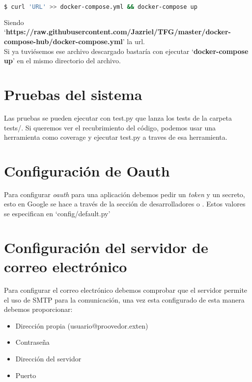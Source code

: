 \lstset{style=linestyle}
\begin{lstlisting}[language=bash]
$ curl 'URL' >> docker-compose.yml && docker-compose up
\end{lstlisting}

Siendo `\textbf{https://raw.githubusercontent.com/Jazriel/TFG/master/docker-compose-hub/docker-compose.yml}' la url.
\hphantom{sin esto quedaba mal}\\

Si ya tuviésemos ese archivo descargado bastaría con ejecutar `\textbf{docker-compose up}' en el mismo directorio del archivo.

\section{Pruebas del sistema}

Las pruebas se pueden ejecutar con test.py que lanza los tests de la carpeta tests/. Si queremos ver el recubrimiento del código, podemos usar una herramienta como coverage y ejecutar test.py a traves de esa herramienta.  


\section{Configuración de Oauth}

Para configurar \emph{oauth} para una aplicación debemos pedir un \emph{token} y un secreto, esto en Google se hace a través de la sección de desarrolladores o . Estos valores se especifican en `config/default.py'

\section{Configuración del servidor de correo electrónico}

Para configurar el correo electrónico debemos comprobar que el servidor permite el uso de SMTP para la comunicación, una vez esta configurado de esta manera debemos proporcionar:

\begin{itemize}
\setlength{\itemsep}{1pt}
\setlength{\parskip}{0pt}
\setlength{\parsep}{0pt}
\item Dirección propia (usuario@proovedor.exten)
\item Contraseña
\item Dirección del servidor
\item Puerto
\end{itemize}





